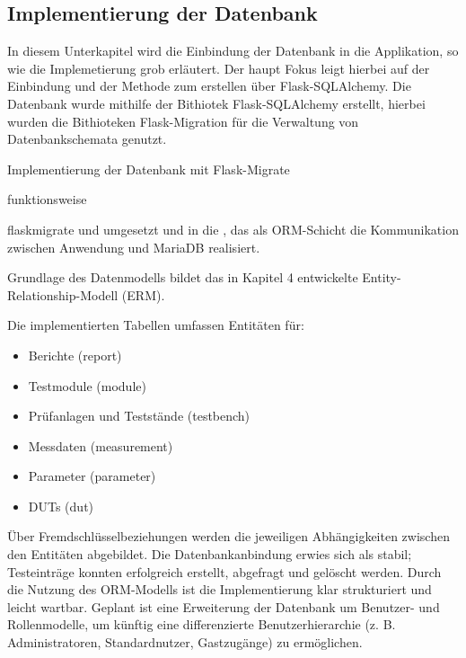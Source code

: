 \subsection{Implementierung der Datenbank}
\label{subsec:implementierung-der-datenbank}

In diesem Unterkapitel wird die Einbindung der Datenbank in die Applikation, so wie die Implemetierung grob erläutert.
Der haupt Fokus leigt hierbei auf der Einbindung und der Methode zum erstellen über Flask-SQLAlchemy.
Die Datenbank wurde mithilfe der Bithiotek Flask-SQLAlchemy erstellt, hierbei wurden die Bithioteken
Flask-Migration für die Verwaltung von Datenbankschemata genutzt.


Implementierung der Datenbank mit Flask-Migrate


funktionsweise

flaskmigrate und  umgesetzt und in die , das als ORM-Schicht
die Kommunikation zwischen Anwendung und MariaDB realisiert.

Grundlage des Datenmodells bildet das in Kapitel 4 entwickelte Entity-Relationship-Modell (ERM).

Die implementierten Tabellen umfassen Entitäten für:

\begin{itemize}

\item
Berichte (report)

\item
Testmodule (module)

\item
Prüfanlagen und Teststände (testbench)

\item
Messdaten (measurement)

\item
Parameter (parameter)

\item
DUTs (dut)

\end{itemize}

Über Fremdschlüsselbeziehungen werden die jeweiligen Abhängigkeiten zwischen den Entitäten abgebildet.
Die Datenbankanbindung erwies sich als stabil; Testeinträge konnten erfolgreich erstellt, abgefragt und gelöscht werden.
Durch die Nutzung des ORM-Modells ist die Implementierung klar strukturiert und leicht wartbar.
Geplant ist eine Erweiterung der Datenbank um Benutzer- und Rollenmodelle, um künftig eine differenzierte Benutzerhierarchie
(z. B. Administratoren, Standardnutzer, Gastzugänge) zu ermöglichen.


